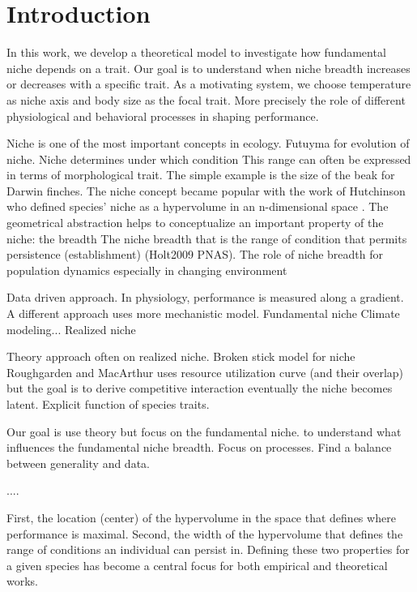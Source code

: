 \section*{Introduction}


In this work, we develop a theoretical model to investigate how fundamental niche depends on a trait.
Our goal is to understand when niche breadth increases or decreases with a specific trait.
As a motivating system, we choose temperature as niche axis and body size as the focal trait. 
More precisely the role of different physiological and behavioral processes in shaping performance.
 

 



Niche is one of the most important concepts in ecology.
Futuyma for evolution of niche.
Niche determines under which condition 
This range can often be expressed in terms of morphological trait. 
The simple example is the size of the beak for Darwin finches.
The niche concept became popular with the work of Hutchinson who defined species' niche as a hypervolume in an n-dimensional space \citep{Hutchinson1957}.
The geometrical abstraction helps to conceptualize an important property of the niche: the breadth
The niche breadth that is the range of condition that permits persistence (establishment) (Holt2009 PNAS).
The role of niche breadth for population dynamics especially in changing environment 
      
Data driven approach.
In physiology, performance is measured along a gradient.
A different approach uses more mechanistic model.
Fundamental niche
Climate modeling...
Realized niche

Theory approach often on realized niche.
Broken stick model for niche
Roughgarden and MacArthur uses resource utilization curve (and their overlap) but the goal is to derive competitive interaction eventually the niche becomes latent. 
Explicit function of species traits.    

Our goal is use theory but focus on the fundamental niche.
to understand what influences the fundamental niche breadth.
Focus on processes.
Find a balance between generality and data. 

....   
  
  
First, the location (center) of the hypervolume in the space that defines where performance is maximal.
Second, the width of the hypervolume that defines the range of conditions an individual can persist in. 
Defining these two properties for a given species has become a central focus for both empirical and theoretical works.


